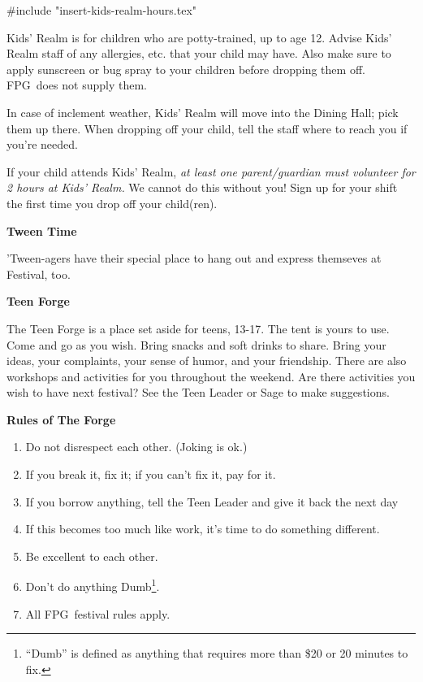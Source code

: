 \documentclass[9pt,twoside,openright,final,article]{memoir}
\def\fpg{{\beltanefamily FPG\ }}
\renewcommand{\subsection}[1]{%
  \vspace{6pt}%
  \needspace{1.25in}%
  \begin{center}\textbf{\Large \beltanefamily #1}\end{center}

  \nopagebreak}
\begin{document}
\begin{multicols}{2}
  #include "insert-kids-realm-hours.tex"

  Kids'  Realm is  for  children  who are  potty-trained,  up  to age  12.
  Advise Kids'  Realm staff  of any  allergies, etc.  that your  child may
  have. Also  make sure to apply  sunscreen or bug spray  to your children
  before dropping them off. \fpg does not supply them.

  In case  of inclement  weather, Kids'  Realm will  move into  the Dining
  Hall; pick them  up there. When dropping off your  child, tell the staff
  where to reach you if you're needed.

  If your  child attends Kids'  Realm, \emph{at least  one parent/guardian
    must volunteer for 2 hours at  Kids' Realm.} We cannot do this without
  you! Sign up for your shift the first time you drop off your child(ren).

  \subsection{Tween Time}

  'Tween-agers have their special place  to hang out and express themseves
  at Festival, too.


  \subsection{Teen Forge}

  The Teen Forge is a place set aside for teens, 13-17. The tent is
  yours to use. Come and go as you wish. Bring snacks and soft drinks
  to share. Bring your ideas, your complaints, your sense of humor,
  and your friendship. There are also workshops and activities for you
  throughout the weekend. Are there activities you wish to have next
  festival? See the Teen Leader or Sage to make suggestions.

  \subsection{Rules of The Forge}

  {\small
    \begin{enumerate}
    \item Do not disrespect each other. {\tiny (Joking is ok.)}
    \item If you break it, fix it; if you can't fix it, pay for it.
    \item If you borrow anything, tell the Teen Leader and give it
      back the next day
    \item If this becomes too much like work, it's time to do
      something different.
    \item Be excellent to each other.
    \item  Don't  do  anything   Dumb\footnote{``Dumb''  is  defined  as
        anything that requires more than \$20 or 20 minutes to fix.}.
    \item All \fpg festival rules apply.
    \end{enumerate}
  }



\end{multicols}
\end{document}
